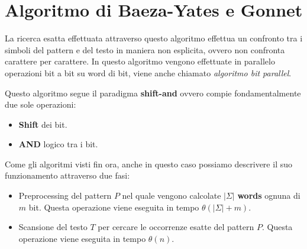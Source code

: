 \section{Algoritmo di Baeza-Yates e Gonnet}
La ricerca esatta effettuata attraverso questo algoritmo effettua un confronto
tra i simboli del pattern e del testo in maniera non esplicita, ovvero non confronta
carattere per carattere. In questo algoritmo vengono effettuate in parallelo operazioni
bit a bit su word di bit, viene anche chiamato \textit{algoritmo bit parallel}.

Questo algoritmo segue il paradigma \textbf{shift-and} ovvero compie fondamentalmente
due sole operazioni:
\begin{itemize}
    \item \textbf{Shift} dei bit.
    \item \textbf{AND} logico tra i bit.
\end{itemize}
Come gli algoritmi visti fin ora, anche in questo caso possiamo descrivere il suo
funzionamento attraverso due fasi:
\begin{itemize}
    \item Preprocessing del pattern $P$ nel quale vengono calcolate $|\Sigma|$
          \textbf{words} ognuna di $m$ bit. Questa operazione viene eseguita in tempo $\theta(|\Sigma| + m)$.
    \item Scansione del testo $T$ per cercare le occorrenze esatte del pattern
          $P$. Questa operazione viene eseguita in tempo $\theta(n)$.
\end{itemize}
